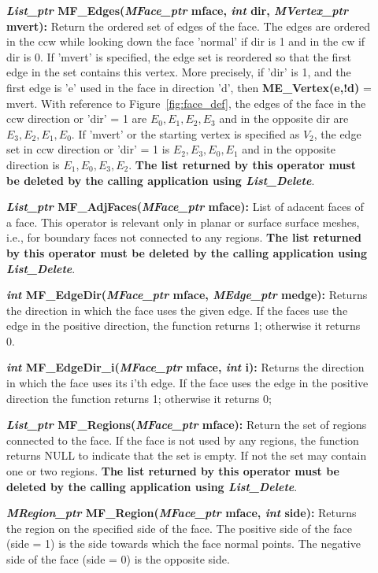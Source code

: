 \documentclass[12pt]{article}
\begin{document}
\begin{description}
\item[]{\bf {\em List\_ptr} MF\_Edges({\em MFace\_ptr} mface,
    {\em int} dir, {\em MVertex\_ptr} mvert):} Return the
  ordered set of edges of the face. The edges are ordered in the ccw
  while looking down the face 'normal' if dir is 1 and in the cw if
  dir is 0. If 'mvert' is specified, the edge set is reordered so that
  the first edge in the set contains this vertex. More precisely, if
  'dir' is 1, and the first edge is 'e' used in the face in direction
  'd', then {\bf ME\_Vertex(e,!d)} = mvert. With reference to
  Figure~\ref{fig:face_def}, the edges of the face in the ccw direction or
  'dir' = 1 are ${E_0,E_1,E_2,E_3}$ and in the opposite dir are
  ${E_3,E_2,E_1,E_0}$. If 'mvert' or the starting vertex is specified
  as $V_2$, the edge set in ccw direction or 'dir' = 1 is
  ${E_2,E_3,E_0,E_1}$ and in the opposite direction is
  ${E_1,E_0,E_3,E_2}$.  {\bf The list returned by this
  operator must be deleted by the calling application using {\em List\_Delete}}.

\item[]{\bf {\em List\_ptr} MF\_AdjFaces({\em MFace\_ptr} mface):}
List of adacent faces of a face. This operator is relevant only in
planar or surface surface meshes, i.e., for boundary faces not
connected to any regions.  {\bf The list returned by this
  operator must be deleted by the calling application using {\em List\_Delete}}.

\item[]{\bf {\em int} MF\_EdgeDir({\em MFace\_ptr} mface,
{\em MEdge\_ptr} medge):} Returns the direction in which the face
uses the given edge. If the faces use the edge in the positive direction,
the function returns 1; otherwise it returns 0.

\item[]{\bf {\em int} MF\_EdgeDir\_i({\em MFace\_ptr} mface,
{\em int} i):} Returns the direction in which the face uses its i'th
edge. If the face uses the edge in the positive direction the function
returns 1; otherwise it returns 0;

\item[]{\bf {\em List\_ptr} MF\_Regions({\em MFace\_ptr} mface):}
Return the set of regions connected to the face. If the face is not
used by any regions, the function returns NULL to indicate that the
set is empty. If not the set may contain one or two regions.  {\bf The list returned by this
  operator must be deleted by the calling application using {\em List\_Delete}}.

\item[]{\bf {\em MRegion\_ptr} MF\_Region({\em MFace\_ptr} mface,
{\em int} side):} Returns the region on the specified side of the
face. The positive side of the face (side = 1) is the side towards
which the face normal points. The negative side of the face (side = 0)
is the opposite side.


\end{description}
\end{document}
